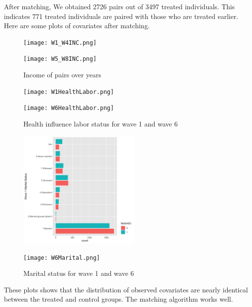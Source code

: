 \documentclass[aoas,preprint]{imsart}
\begin{document}
After matching, We obtained 2726 pairs out of 3497 treated individuals. This indicates 771 treated individuals are paired with those who are treated earlier. Here are some plots of covariates after matching.

\begin{figure}[htbp]
\centering
\begin{minipage}[t]{0.48\textwidth}
\centering
\texttt{[image: W1\_W4INC.png]}
\end{minipage}
\begin{minipage}[t]{0.48\textwidth}
\centering
\texttt{[image: W5\_W8INC.png]}
\end{minipage}
\caption{Income of pairs over years}
\end{figure}

\begin{figure}[htbp]
\centering
\begin{minipage}[t]{0.48\textwidth}
\centering
\texttt{[image: W1HealthLabor.png]}
\end{minipage}
\begin{minipage}[t]{0.48\textwidth}
\centering
\texttt{[image: W6HealthLabor.png]}
\end{minipage}
\caption{Health influence labor status for wave 1 and wave 6}
\end{figure}

\begin{figure}[htbp]
\centering
\begin{minipage}[t]{0.48\textwidth}
\centering
\includegraphics[width=6cm]{W1Marital.png}
\end{minipage}
\begin{minipage}[t]{0.48\textwidth}
\centering
\texttt{[image: W6Marital.png]}
\end{minipage}
\caption{Marital status for wave 1 and wave 6}
\end{figure}

These plots shows that the distribution of observed covariates are nearly identical between the treated and control groups. The matching algorithm works well.
\end{document}
